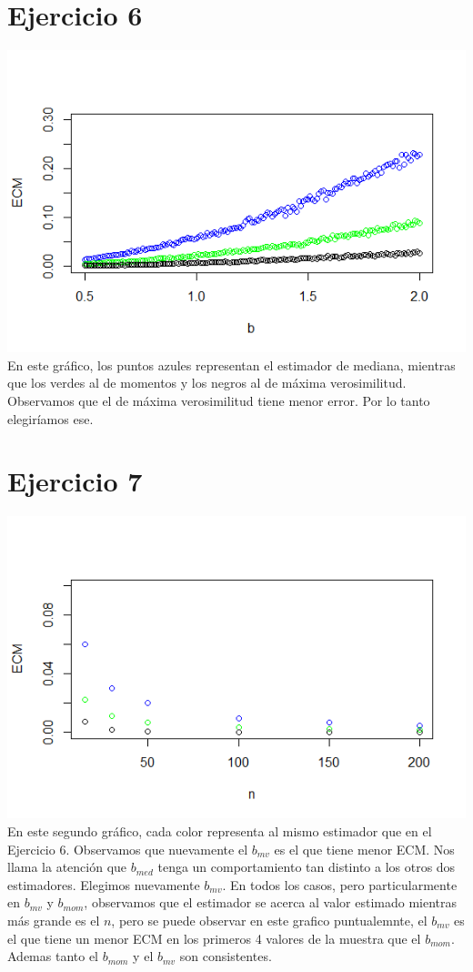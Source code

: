 \documentclass{article}
\begin{document}
\section{Ejercicio 6}
\includegraphics[scale=0.85]{ej6.png}
En este gráfico, los puntos azules representan el estimador de mediana, mientras que los verdes al de momentos y los negros al de máxima verosimilitud.
Observamos que el de máxima verosimilitud tiene menor error. Por lo tanto elegiríamos ese.

\section{Ejercicio 7}
\includegraphics[scale=0.85]{ej7.png}
En este segundo gráfico, cada color representa al mismo estimador que en el Ejercicio 6.
Observamos que nuevamente el $b_{mv}$ es el que tiene menor ECM. Nos llama la atención que $b_{med}$ tenga un comportamiento tan distinto a los otros dos estimadores. Elegimos nuevamente $b_{mv}$. En todos los casos, pero particularmente en $b_{mv}$ y $b_{mom}$, observamos que el estimador se acerca al valor estimado mientras más grande es el $n$, pero se puede observar en este grafico puntualemnte, el $b_{mv}$ es el que tiene un menor ECM en los primeros 4 valores de la muestra que el $b_{mom}$. Ademas tanto el $b_{mom}$ y el $b_{mv}$ son consistentes.
\end{document}
